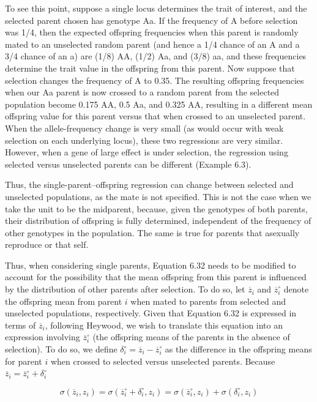 \documentclass{article}
\begin{document}
To see this point, suppose a single locus determines the trait of interest, and the selected parent chosen has genotype Aa. If the frequency of A before selection was 1/4, then the expected offspring frequencies when this parent is randomly mated to an unselected random parent (and hence a 1/4 chance of an A and a 3/4 chance of an a) are (1/8) AA, (1/2) Aa, and (3/8) aa, and these frequencies determine the trait value in the offspring from this parent. Now suppose that selection changes the frequency of A to 0.35. The resulting offspring frequencies when our Aa parent is now crossed to a random parent from the selected population become 0.175 AA, 0.5 Aa, and 0.325 AA, resulting in a different mean offspring value for this parent versus that when crossed to an unselected parent. When the allele-frequency change is very small (as would occur with weak selection on each underlying locus), these two regressions are very similar. However, when a gene of large effect is under selection, the regression using selected versus unselected parents can be different (Example 6.3).

Thus, the single-parent–offspring regression can change between selected and unselected populations, as the mate is not specified. This is not the case when we take the unit to be the midparent, because, given the genotypes of both parents, their distribution of offspring is fully determined, independent of the frequency of other genotypes in the population. The same is true for parents that asexually reproduce or that self.

Thus, when considering single parents, Equation 6.32 needs to be modified to account for the possibility that the mean offspring from this parent is influenced by the distribution of other parents after selection. To do so, let  $ \overline{z}_i $ and  $ \overline{z}_i^\circ $ denote the offspring mean from parent  $ i $ when mated to parents from selected and unselected populations, respectively. Given that Equation 6.32 is expressed in terms of  $ \overline{z}_i $, following Heywood, we wish to translate this equation into an expression involving  $ \overline{z}_i^\circ $ (the offspring means of the parents in the absence of selection). To do so, we define  $ \delta_i^\circ = \overline{z}_i - \overline{z}_i^\circ $ as the difference in the offspring means for parent  $ i $ when crossed to selected versus unselected parents. Because  $ \overline{z}_i = \overline{z}_i^\circ + \delta_i^\circ $

\begin{equation}
\sigma(\overline{z}_{i},z_{i})=\sigma(\overline{z}_{i}^{\circ}+\delta_{i}^{\circ},z_{i})=\sigma(\overline{z}_{i}^{\circ},z_{i})+\sigma(\delta_{i}^{\circ},z_{i})
\tag{6.34}
\label{eq:6_34}
\end{equation}
\end{document}

